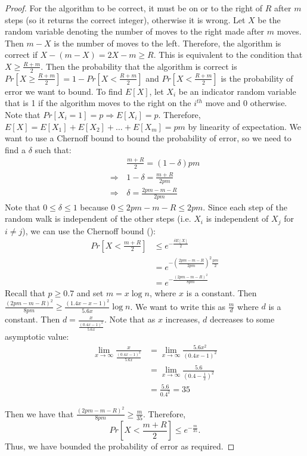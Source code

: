 \documentclass[12pt]{article}
\begin{document}
\begin{proof}
For the algorithm to be correct, it must be on or to the right of $R$ after $m$ steps (so it returns the correct integer), otherwise it is wrong. Let $X$ be the random variable denoting the number of moves to the right made after $m$ moves. Then $m-X$ is the number of moves to the left. Therefore, the algorithm is correct if $X - (m - X) = 2X - m \geq R$. This is equivalent to the condition that $X \geq \frac{R + m}{2}$. Then the probability that the algorithm is correct is $Pr[X \geq \frac{R + m}{2}] = 1 - Pr[X < \frac{R + m}{2}]$ and $Pr[X < \frac{R + m}{2}]$ is the probability of error we want to bound. To find $E[X]$, let $X_i$ be an indicator random variable that is 1 if the algorithm moves to the right on the $i^{th}$ move and 0 otherwise. Note that $Pr[X_i = 1] = p \Rightarrow E[X_i] = p$. Therefore, $E[X] = E[X_1] + E[X_2] + \ldots + E[X_m] = pm$ by linearity of expectation. We want to use a Chernoff bound to bound the probability of error, so we need to find a $\delta$ such that:
\begin{align*}
&\frac{m+R}{2} = (1-\delta)pm \\
\Rightarrow \, &1-\delta = \frac{m + R}{2pm} \\
\Rightarrow \,&\delta = \frac{2pm - m - R}{2pm} 
\end{align*}
Note that $0 \leq \delta \leq 1$ because $0 \leq 2pm - m - R \leq 2pm$. Since each step of the random walk is independent of the other steps (i.e. $X_i$ is independent of $X_j$ for $i \neq j$), we can use the Chernoff bound (\cite{Lehman}):
\begin{align*}
Pr[X < \frac{m + R}{2}] &\leq e^{-\frac{\delta E[X]}{2}} \\
&= e^{-\left(\frac{2pm - m - R}{2pm}\right)^2 \frac{pm}{2}} \\
&= e^{-\frac{\left(2pm - m - R\right)^2}{8pm}} 
\end{align*}
Recall that $p \geq 0.7$ and set $m = x\log{n}$, where $x$ is a constant. Then $\frac{(2pm - m - R)^2}{8pm} \geq \frac{\left(1.4x - x - 1\right)^2}{5.6x}\log{n}$. We want to write this as $\frac{m}{d}$ where $d$ is a constant. Then $d = \frac{x}{\frac{\left(0.4x - 1\right)^2}{5.6x}}$. Note that as $x$ increases, $d$ decreases to some asymptotic value: 
\begin{align*}
\lim_{x\to\infty} \frac{x}{\frac{\left(0.4x - 1\right)^2}{5.6x}} &= \lim_{x\to\infty} \frac{5.6 x^2}{\left(0.4x - 1\right)^2} \\
&= \lim_{x\to\infty}\frac{5.6}{\left(0.4 - \frac{1}{x}\right)^2} \\
&= \frac{5.6}{0.4^2} = 35
\end{align*}

Then we have that $\frac{\left(2pm - m - R\right)^2}{8pm} \geq \frac{m}{35}$. Therefore, $$Pr[X < \frac{m + R}{2}] \leq e^{-\frac{m}{35}}.$$ Thus, we have bounded the probability of error as required.
\end{proof}
\end{document}

